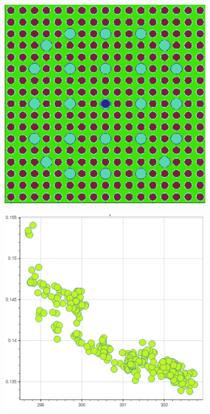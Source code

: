 \begin{figure}[h!]
\centering
\begin{subfigure}{0.42\textwidth}
  \centering
  \includegraphics[width=0.9\linewidth]{figures/unsupervised/features/assm-16/geometry}
  \caption{}
  \label{fig:chap10-fiss-mean-std-geom}
\end{subfigure}%
\begin{subfigure}{0.42\textwidth}
  \centering
  \includegraphics[width=0.9\linewidth]{figures/unsupervised/features/assm-16/u235-fiss/mean-std/mgxs}

\end{subfigure}
\end{figure}
